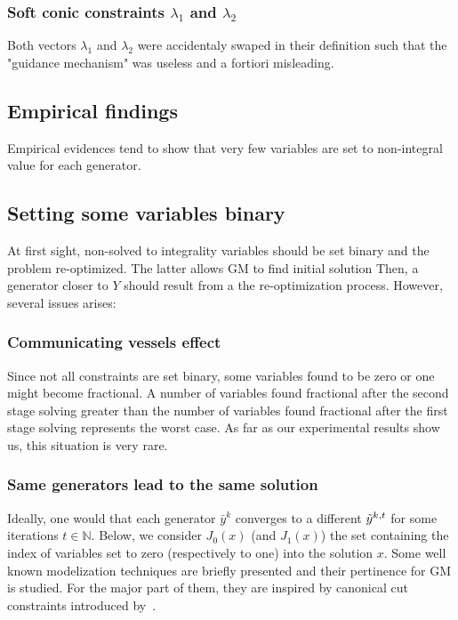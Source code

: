 \subsubsection*{Soft conic constraints $\lambda_1$ and $\lambda_2$}
Both vectors $\lambda_1$ and $\lambda_2$ were accidentaly swaped in their definition such that the "guidance mechanism" was useless and a fortiori misleading.

\subsection{Empirical findings}
Empirical evidences tend to show that very few variables are set to non-integral value for each generator.

\subsection{Setting some variables binary}
At first sight, non-solved to integrality variables should be set binary and the problem re-optimized. The latter allows GM to find initial solution Then, a generator closer to $Y$ should result from a the re-optimization process. However, several issues arises:

\subsubsection{Communicating vessels effect}
Since not all constraints are set binary, some variables found to be zero or one might become fractional. 
A number of variables found fractional after the second stage solving greater than the number of variables found fractional after the first stage solving represents the worst case. 
As far as our experimental results show us, this situation is very rare. 
\subsubsection{Same generators lead to the same solution}
Ideally, one would that each generator $\bar{y}^k$ converges to a different $\Tilde{y}^{k,t}$ for some iterations $t\in \mathbb{N}$.
Below, we consider $J_0(x)$ (and $J_1(x)$) the set containing the index of variables set to zero (respectively to one) into the solution $x$.
Some well known modelization techniques are briefly presented and their pertinence for GM is studied. For the major part of them, 
they are inspired by canonical cut constraints introduced by~\cite{canonical_cut}.
